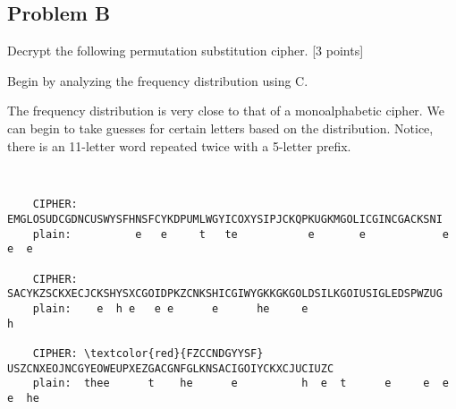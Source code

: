 \documentclass[../hw_sols.tex]{subfiles}
\begin{document}
\subsection*{Problem B}
Decrypt the following permutation substitution cipher. [3 points]



\begin{solution}
Begin by analyzing the frequency distribution using C.




\noindent The frequency distribution is very close to that of a monoalphabetic cipher. We can begin to take guesses for certain letters based on the distribution. Notice, there is an 11-letter word repeated twice with a 5-letter prefix.

	\begin{BVerbatim}[commandchars=\\\{\}]


    CIPHER: EMGLOSUDCGDNCUSWYSFHNSFCYKDPUMLWGYICOXYSIPJCKQPKUGKMGOLICGINCGACKSNI
    plain:          e   e     t   te           e       e            e   e  e

    CIPHER: SACYKZSCKXECJCKSHYSXCGOIDPKZCNKSHICGIWYGKKGKGOLDSILKGOIUSIGLEDSPWZUG
    plain:    e  h e   e e      e      he     e                              h

    CIPHER: \textcolor{red}{FZCCNDGYYSF}  USZCNXEOJNCGYEOWEUPXEZGACGNFGLKNSACIGOIYCKXCJUCIUZC
    plain:  thee      t    he      e          h  e  t      e     e  e  e  he


\end{BVerbatim}
\end{solution}
\end{document}
